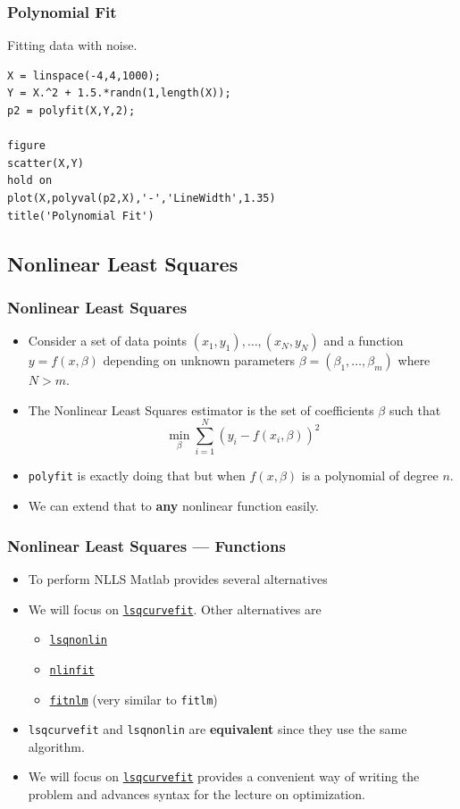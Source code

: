 \documentclass[11pt,xcolor={svgnames},aspectratio=169,usepdftitle=false]{beamer}
\begin{document}
\begin{frame}[fragile]
  \frametitle{Polynomial Fit}
Fitting data with noise.
\begin{lstlisting}
X = linspace(-4,4,1000);
Y = X.^2 + 1.5.*randn(1,length(X));
p2 = polyfit(X,Y,2);

figure
scatter(X,Y)
hold on
plot(X,polyval(p2,X),'-','LineWidth',1.35)
title('Polynomial Fit')
\end{lstlisting}
\end{frame}

\subsection{Nonlinear Least Squares}

\begin{frame}[fragile]
  \frametitle{Nonlinear Least Squares}
\begin{itemize}
  \item Consider a set of data points $(x_1,y_1),\ldots,(x_N,y_N)$ and a function $y = f(x,\beta)$ depending on unknown parameters $\beta = (\beta_1,\ldots,\beta_m)$ where $N > m$.
  \item The Nonlinear Least Squares estimator is the set of coefficients $\beta$ such that
  \[
  \underset{\beta}{\min} \sum^N_{i=1} (y_i - f(x_i,\beta))^2
  \]
  \item \verb;polyfit; is exactly doing that but when $f(x,\beta)$ is a polynomial of degree $n$.
  \item We can extend that to \alert{\textbf{any}} nonlinear function easily.
\end{itemize}
\end{frame}

\begin{frame}[fragile]
  \frametitle{Nonlinear Least Squares --- Functions}
\begin{itemize}
  \item To perform NLLS Matlab provides several alternatives
  \item We will focus on \href{https://www.mathworks.com/help/optim/ug/lsqcurvefit.html}{\texttt{lsqcurvefit}}. Other alternatives are
  \begin{itemize}
    \item \href{https://www.mathworks.com/help/optim/ug/lsqnonlin.html}{\texttt{lsqnonlin}}
    \item \href{https://www.mathworks.com/help/stats/nlinfit.html}{\texttt{nlinfit}}
    \item \href{https://www.mathworks.com/help/stats/fitnlm.html}{\texttt{fitnlm}} (very similar to \texttt{fitlm})
  \end{itemize}
  \item \texttt{lsqcurvefit} and \texttt{lsqnonlin} are \alert{\textbf{equivalent}} since they use the same algorithm.
  \item We will focus on \href{https://www.mathworks.com/help/optim/ug/lsqcurvefit.html}{\texttt{lsqcurvefit}} provides a convenient way of writing the problem and advances syntax for the lecture on optimization.
\end{itemize}
\end{frame}
\end{document}
